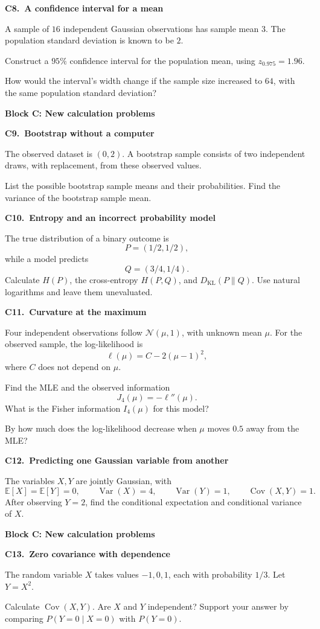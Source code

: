 \documentclass[11pt,a4paper]{article}
\newcommand{\blocktitle}[2]{{\Large\sffamily\bfseries\color{Ink}Block #1: #2}\par\vspace{5pt}}
\newenvironment{question}[2]{\par\addvspace{10pt}\begin{minipage}{\linewidth}{\sffamily\bfseries\color{Ink}#1.\ #2}\par\vspace{3pt}}{\end{minipage}\par}
\newcommand{\E}{\mathbb E}
\newcommand{\Var}{\operatorname{Var}}
\newcommand{\Cov}{\operatorname{Cov}}
\begin{document}
\begin{question}{C8}{A confidence interval for a mean}
A sample of $16$ independent Gaussian observations has sample mean $3$.
The population standard deviation is known to be $2$.

Construct a $95\%$ confidence interval for the population mean, using
$z_{0.975}=1.96$.

How would the interval's width change if the sample size increased to $64$,
with the same population standard deviation?
\end{question}

\newpage
\blocktitle{C}{New calculation problems}
\begin{question}{C9}{Bootstrap without a computer}
The observed dataset is $(0,2)$. A bootstrap sample consists of two
independent draws, with replacement, from these observed values.

List the possible bootstrap sample means and their probabilities.
Find the variance of the bootstrap sample mean.
\end{question}

\begin{question}{C10}{Entropy and an incorrect probability model}
The true distribution of a binary outcome is
\[
P=(1/2,1/2),
\]
while a model predicts
\[
Q=(3/4,1/4).
\]
Calculate $H(P)$, the cross-entropy $H(P,Q)$, and $D_{\mathrm{KL}}(P\|Q)$.
Use natural logarithms and leave them unevaluated.
\end{question}

\begin{question}{C11}{Curvature at the maximum}
Four independent observations follow $\mathcal N(\mu,1)$, with unknown mean
$\mu$. For the observed sample, the log-likelihood is
\[
\ell(\mu)=C-2(\mu-1)^2,
\]
where $C$ does not depend on $\mu$.

Find the MLE and the observed information
\[
J_4(\mu)=-\ell''(\mu).
\]
What is the Fisher information $I_4(\mu)$ for this model?

By how much does the log-likelihood decrease when $\mu$ moves $0.5$ away
from the MLE?
\end{question}

\begin{question}{C12}{Predicting one Gaussian variable from another}
The variables $X,Y$ are jointly Gaussian, with
\[
\E[X]=\E[Y]=0,\qquad
\Var(X)=4,\qquad
\Var(Y)=1,\qquad
\Cov(X,Y)=1.
\]
After observing $Y=2$, find the conditional expectation and conditional
variance of $X$.
\end{question}
\newpage
\blocktitle{C}{New calculation problems}
\begin{question}{C13}{Zero covariance with dependence}
The random variable $X$ takes values $-1,0,1$, each with probability $1/3$.
Let $Y=X^2$.

Calculate $\Cov(X,Y)$. Are $X$ and $Y$ independent? Support your answer
by comparing $P(Y=0\mid X=0)$ with $P(Y=0)$.
\end{question}
\end{document}
